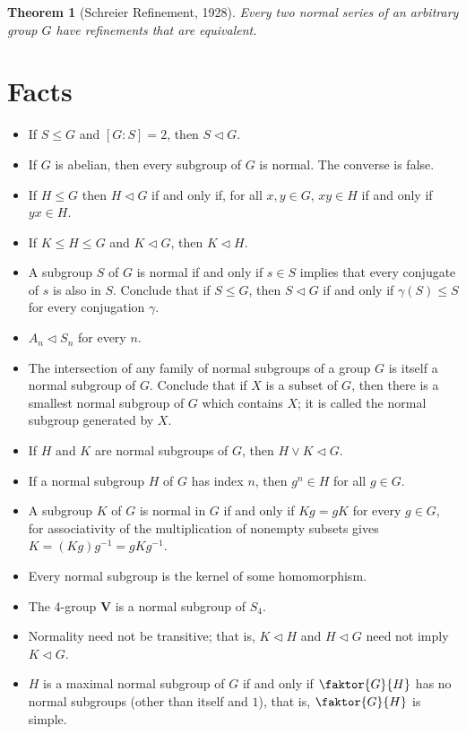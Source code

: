 \documentclass[12pt]{report}
\newtheorem{theorem}{Theorem}[chapter]
\theoremstyle{definition}
\begin{document}
\begin{theorem}[Schreier Refinement, 1928]
	Every two normal series of an arbitrary group $G$ have refinements that are equivalent.
\end{theorem}


\newpage
\section{Facts}
\begin{itemize}
	\item If $S\leq G$ and $[G:S]=2$, then $S\vartriangleleft G$.
	\item If $G$ is abelian, then every subgroup of $G$ is normal. The converse is false.
	\item If $H\leq G$ then $H\vartriangleleft G$ if and only if, for all $x,y\in G$, $xy\in H$ if and only if $yx\in H$.
	\item If $K\leq H\leq G$ and $K\vartriangleleft G$, then $K\vartriangleleft H$.
	\item A subgroup $S$ of $G$ is normal if and only if $s\in S$ implies that every conjugate of $s$ is also in $S$. Conclude that if $S\leq G$, then $S\vartriangleleft G$ if and only if $\gamma(S)\leq S$ for every conjugation $\gamma$.
	\item $A_n\vartriangleleft S_n$ for every $n$.
	\item The intersection of any family of normal subgroups of a group $G$ is itself a normal subgroup of $G$. Conclude that if $X$ is a subset of $G$, then there is a smallest normal subgroup of $G$ which contains $X$; it is called the normal subgroup generated by $X$.
	\item If $H$ and $K$ are normal subgroups of $G$, then $H\vee K\vartriangleleft G$.
	\item If a normal subgroup $H$ of $G$ has index $n$, then $g^n\in H$ for all $g\in G$.
	\item A subgroup $K$ of $G$ is normal in $G$ if and only if $Kg = gK$ for every $g\in G$, for associativity of the multiplication of nonempty subsets gives $K = (Kg)g^{-1} = gKg^{-1}$.
	\item Every normal subgroup is the kernel of some homomorphism.
	\item The 4-group $\mathbf{V}$ is a normal subgroup of $S_4$.
	\item Normality need not be transitive; that is, $K\vartriangleleft H$ and $H\vartriangleleft G$ need not imply $K\vartriangleleft G$.
	\item $H$ is a maximal normal subgroup of $G$ if and only if $\faktor{G}{H}$ has no normal subgroups (other than itself and $1$), that is, $\faktor{G}{H}$ is simple.

\end{itemize}
\end{document}
